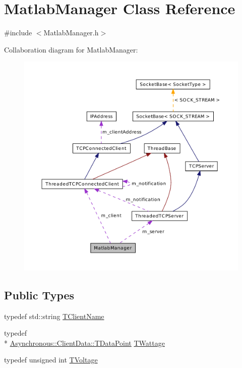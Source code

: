 \hypertarget{class_matlab_manager}{\section{Matlab\-Manager Class Reference}
\label{class_matlab_manager}
}


{\ttfamily \#include $<$Matlab\-Manager.\-h$>$}



Collaboration diagram for Matlab\-Manager\-:\nopagebreak
\begin{figure}[H]
\begin{center}
\leavevmode
\includegraphics[width=350pt]{class_matlab_manager__coll__graph}
\end{center}
\end{figure}
\subsection*{Public Types}
\begin{DoxyCompactItemize}
\item 
typedef std\-::string \hyperlink{class_matlab_manager_a62cb494115d46fdf4ecc6bd369fe0320}{T\-Client\-Name}
\item 
typedef \\*
\hyperlink{class_terra_swarm_1_1_asynchronous_1_1_client_data_ac733720fed15e940f991de44f1bb514e}{Asynchronous\-::\-Client\-Data\-::\-T\-Data\-Point} \hyperlink{class_matlab_manager_a410b78f356aeacba5c43efee93d8c27d}{T\-Wattage}
\item 
typedef unsigned int \hyperlink{class_matlab_manager_a00f47f07c7dfd449fc39db6c09f6304a}{T\-Voltage}
\end{DoxyCompactItemize}
